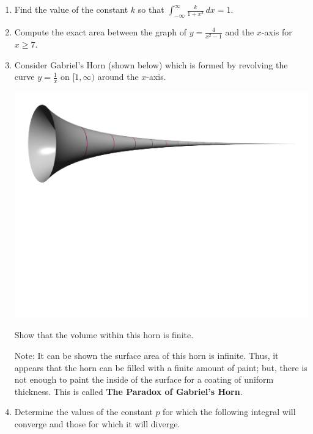 \documentclass[12pt]{article}
\newif\ifans
\begin{document}
\begin{enumerate}
\ifans{\fbox{$-\infty$}} \fi

\item Find the value of the constant $k$ so that $\int_{-\infty}^{\infty} \frac{k}{1+x^2} \,dx=1$.

\ifans{\fbox{$\frac{1}{\pi}$}} \fi

\item Compute the exact area between the graph of $y=\frac{4}{x^2-1}$ and the $x$-axis for $x \geq 7$.

\ifans{\fbox{$2\ln{\left(\frac{4}{3}\right)}$}} \fi

\item Consider Gabriel's Horn (shown below) which is formed by revolving the curve $y=\frac{1}{x}$ on $[1,\infty)$ around the $x$-axis.

\begin{center}
\includegraphics[scale=0.6]{GabrielHorn.pdf}
\end{center}

Show that the volume within this horn is finite.

\bigskip

Note: It can be shown the surface area of this horn is infinite.  Thus, it appears that the horn can be filled with a finite amount of paint; but, there is not enough to paint the inside of the surface for a coating of uniform thickness.  This is called {\bf The Paradox of Gabriel's Horn}.

\ifans{\fbox{$V=\pi$ cubic units}} \fi

\item Determine the values of the constant $p$ for which the following integral will converge and those for which it will diverge.  


\end{enumerate}
\end{document}
